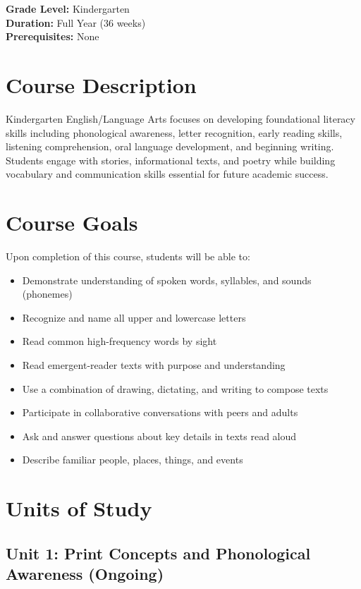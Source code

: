 \documentclass[11pt,letterpaper]{report}
\begin{document}
\textbf{Grade Level:} Kindergarten\\
\textbf{Duration:} Full Year (36 weeks)\\
\textbf{Prerequisites:} None

\section{Course Description}

Kindergarten English/Language Arts focuses on developing foundational literacy skills including phonological awareness, letter recognition, early reading skills, listening comprehension, oral language development, and beginning writing. Students engage with stories, informational texts, and poetry while building vocabulary and communication skills essential for future academic success.

\section{Course Goals}

Upon completion of this course, students will be able to:

\begin{itemize}
    \item Demonstrate understanding of spoken words, syllables, and sounds (phonemes)
    \item Recognize and name all upper and lowercase letters
    \item Read common high-frequency words by sight
    \item Read emergent-reader texts with purpose and understanding
    \item Use a combination of drawing, dictating, and writing to compose texts
    \item Participate in collaborative conversations with peers and adults
    \item Ask and answer questions about key details in texts read aloud
    \item Describe familiar people, places, things, and events
\end{itemize}

\section{Units of Study}

\subsection{Unit 1: Print Concepts and Phonological Awareness (Ongoing)}
\end{document}
